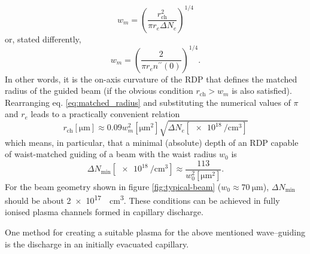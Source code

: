 \documentclass[../main.tex]{subfiles}
\begin{document}
\begin{equation}
    w_m=\left( \frac{r_\text{ch}^2}{\pi r_e \Delta N_e}\right)^{1/4}
    \label{eq:matched_radius}
\end{equation}
or, stated differently,
\begin{equation}
    w_m=\left( \frac{2}{\pi r_e n^{\prime\prime}(0)}\right)^{1/4}.
\end{equation}
In other words, it is the on-axis curvature of the RDP that defines the matched radius of the guided beam (if the obvious condition $r_\text{ch}>w_m$ is also satisfied).
Rearranging eq. \ref{eq:matched_radius} and substituting the numerical values of $\pi$ and $r_e$ leads to a practically convenient relation
\begin{equation}
    r_\text{ch}\left[\si{\um}\right]\approx0.09 w_m^2\left[\si{\square\um}\right]\sqrt{\Delta N_e\left[\SI{e18}{\per\cubic\cm}\right]}
\end{equation}
which means, in particular, that a minimal (absolute) depth of an RDP capable of waist-matched guiding of a beam with the waist radius $w_0$ is
\begin{equation}
\Delta N_\text{min}\left[\SI{e18}{\per\cubic\cm}\right]\approx\frac{113}{w_0^2\left[\si{\square\um}\right]}.
\end{equation}
For the beam geometry shown in figure  \ref{fig:typical-beam} ($w_0\approx\SI{70}{\um}$), $\Delta N_\text{min}$ should be about \SI{2e17}{\per\cubic\cm}. %
These conditions can be achieved in fully ionised plasma channels formed in capillary discharge\cite{Butler2002GuidingWaveguide,Ehrlich1996GuidingExperiments}.

One method for creating a suitable plasma for the above mentioned wave--guiding is the discharge in an initially evacuated capillary.
\end{document}
